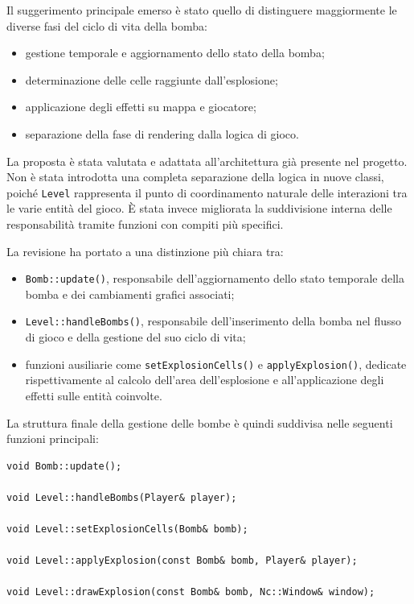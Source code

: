 \documentclass[a4paper,11pt]{article}
\begin{document}
Il suggerimento principale emerso è stato quello di distinguere maggiormente le diverse fasi del ciclo di vita della bomba:
\begin{itemize}
    \item gestione temporale e aggiornamento dello stato della bomba;
    \item determinazione delle celle raggiunte dall'esplosione;
    \item applicazione degli effetti su mappa e giocatore;
    \item separazione della fase di rendering dalla logica di gioco.
\end{itemize}

La proposta è stata valutata e adattata all'architettura già presente nel progetto. 
Non è stata introdotta una completa separazione della logica in nuove classi, poiché \texttt{Level} rappresenta il punto di coordinamento naturale delle interazioni tra le varie entità del gioco. 
È stata invece migliorata la suddivisione interna delle responsabilità tramite funzioni con compiti più specifici.

La revisione ha portato a una distinzione più chiara tra:
\begin{itemize}
    \item \texttt{Bomb::update()}, responsabile dell'aggiornamento dello stato temporale della bomba e dei cambiamenti grafici associati;
    \item \texttt{Level::handleBombs()}, responsabile dell'inserimento della bomba nel flusso di gioco e della gestione del suo ciclo di vita;
    \item funzioni ausiliarie come \texttt{setExplosionCells()} e \texttt{applyExplosion()}, dedicate rispettivamente al calcolo dell'area dell'esplosione e all'applicazione degli effetti sulle entità coinvolte.
\end{itemize}

La struttura finale della gestione delle bombe è quindi suddivisa nelle seguenti funzioni principali:

\begin{verbatim}
void Bomb::update();

void Level::handleBombs(Player& player);

void Level::setExplosionCells(Bomb& bomb);

void Level::applyExplosion(const Bomb& bomb, Player& player);

void Level::drawExplosion(const Bomb& bomb, Nc::Window& window);
\end{verbatim}
\end{document}
